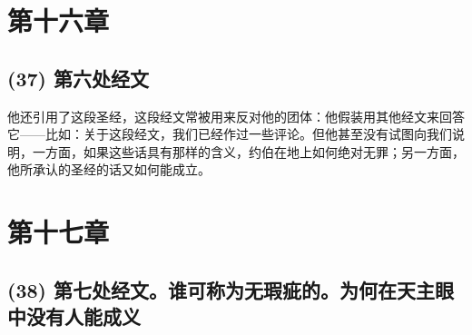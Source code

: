 
\section{第十六章}


\subsection{(37) 第六处经文}

他还引用了这段圣经，这段经文常被用来反对他的团体：他假装用其他经文来回答它——比如：关于这段经文，我们已经作过一些评论。但他甚至没有试图向我们说明，一方面，如果这些话具有那样的含义，约伯在地上如何绝对无罪；另一方面，他所承认的圣经的话又如何能成立。\par


\section{第十七章}


\subsection{(38) 第七处经文。谁可称为无瑕疵的。为何在天主眼中没有人能成义}

